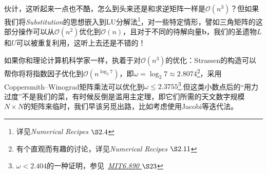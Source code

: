 伙计，这听起来一点也不酷，怎么到头来还是和求逆矩阵一样是$\mathcal{O}(n^3)$？但如果我们将\textit{Substitution}的思想嵌入到LU分解法\footnote{详见\textit{Numerical Recipes $\S 2.4$}}，对一些特定情形，譬如三角矩阵的这部分操作可以从$\mathcal{O}(n^2)$优化到$\mathcal{O}(n)$，且对于不同的待解向量$\bm{b}$，我们的圣遗物$L$和$U$可以被重复利用，这听上去还是不错的！

如果你和理论计算机科学家一样，执着于对$\mathcal{O}(n^3)$的优化：Strassen的构造可以帮你将将指数因子优化到$\mathcal{O}(n^{\log_2 7})$，即$\omega  = \log_2 7 \approx 2.8074$\footnote{有个直观而有趣的讨论，详见\textit{Numerical Recipes $\S 2.11$}}，采用Coppersmith–Winograd矩阵乘法可以优化到$\omega \le 2.3755$\footnote{$\omega < 2.404$的一种证明，参见\ \href{https://people.csail.mit.edu/virgi/6.890/lecture23.pdf}{\textit{MIT6.890 $\S 23$}}}.但这类小数点后的“用力过度”不是我们的菜，有时候反倒是滥用主定理，即它们所需的天文数字规模$N\times N$的矩阵来临时，我们早该另觅出路，比如考虑使用Jacobi等迭代法。
